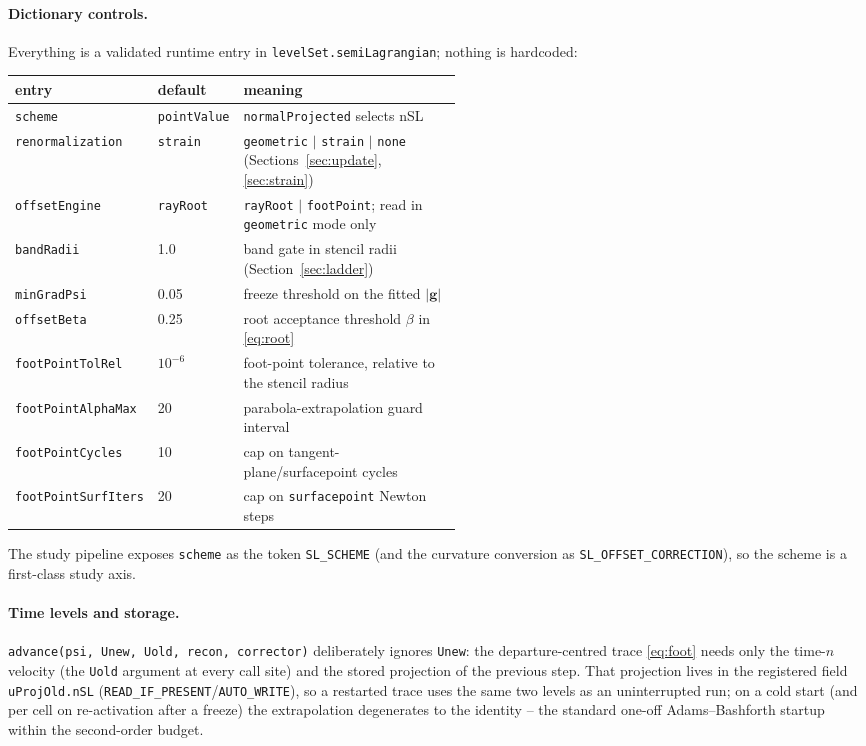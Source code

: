 \documentclass[preprint,3p,11pt]{elsarticle}
\newcommand{\gv}{\mathbf{g}}
\begin{document}
\paragraph{Dictionary controls.} Everything is a validated runtime entry in
\texttt{levelSet.semiLagrangian}; nothing is hardcoded:
\begin{center}\small
\begin{tabular}{llp{0.52\linewidth}}
\toprule
entry & default & meaning \\
\midrule
\texttt{scheme} & \texttt{pointValue} & \texttt{normalProjected} selects nSL \\
\texttt{renormalization} & \texttt{strain} & \texttt{geometric} $\vert$
  \texttt{strain} $\vert$ \texttt{none} (Sections~\ref{sec:update},
  \ref{sec:strain}) \\
\texttt{offsetEngine} & \texttt{rayRoot} & \texttt{rayRoot} $\vert$
  \texttt{footPoint}; read in \texttt{geometric} mode only \\
\texttt{bandRadii} & 1.0 & band gate in stencil radii
  (Section~\ref{sec:ladder}) \\
\texttt{minGradPsi} & 0.05 & freeze threshold on the fitted
  $\lvert\gv\rvert$ \\
\texttt{offsetBeta} & 0.25 & root acceptance threshold $\beta$
  in \eqref{eq:root} \\
\texttt{footPointTolRel} & $10^{-6}$ & foot-point tolerance, relative to the
  stencil radius \\
\texttt{footPointAlphaMax} & 20 & parabola-extrapolation guard interval \\
\texttt{footPointCycles} & 10 & cap on tangent-plane/surfacepoint cycles \\
\texttt{footPointSurfIters} & 20 & cap on \texttt{surfacepoint} Newton steps \\
\bottomrule
\end{tabular}
\end{center}
The study pipeline exposes \texttt{scheme} as the token \texttt{SL\_SCHEME}
(and the curvature conversion as \texttt{SL\_OFFSET\_CORRECTION}), so the
scheme is a first-class study axis.

\paragraph{Time levels and storage.} \texttt{advance(psi, Unew, Uold, recon,
corrector)} deliberately ignores \texttt{Unew}: the departure-centred trace
\eqref{eq:foot} needs only the time-$n$ velocity (the \texttt{Uold} argument
at every call site) and the stored projection of the previous step. That
projection lives in the registered field \texttt{uProjOld.nSL}
(\texttt{READ\_IF\_PRESENT}/\texttt{AUTO\_WRITE}), so a restarted trace uses
the same two levels as an uninterrupted run; on a cold start (and per cell on
re-activation after a freeze) the extrapolation degenerates to the identity --
the standard one-off Adams--Bashforth startup within the second-order budget.
\end{document}
